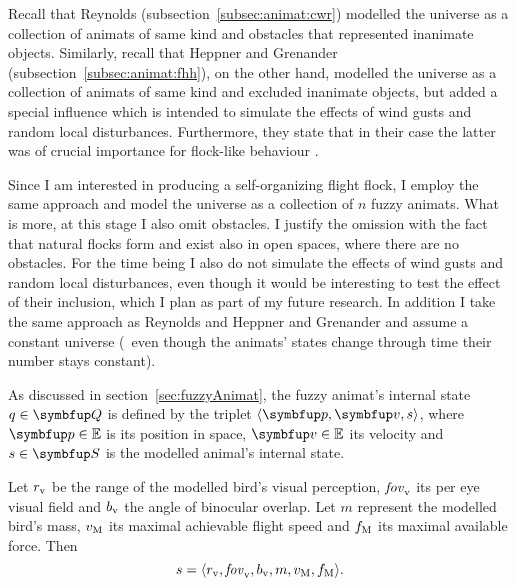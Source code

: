 Recall that Reynolds \cite{reynolds:1987} (subsection~\ref{subsec:animat:cwr}) modelled the universe as a collection of animats of same kind and obstacles that represented inanimate objects. Similarly, recall that Heppner and Grenander \cite{heppner:1990} (subsection~\ref{subsec:animat:fhh}), on the other hand, modelled the universe as a collection of animats of same kind and excluded inanimate objects, but added a special influence which is intended to simulate the effects of wind gusts and random local disturbances. Furthermore, they state that in their case the latter was of crucial importance for flock-like behaviour \cite{heppner:1990}.

Since I am interested in producing a self-organizing flight flock, I employ the same approach and model the universe as a collection of $n$ fuzzy animats. What is more, at this stage I also omit obstacles. I justify the omission with the fact that natural flocks form and exist also in open spaces, where there are no obstacles. For the time being I also do not simulate the effects of wind gusts and random local disturbances, even though it would be interesting to test the effect of their inclusion, which I plan as part of my future research. In addition I take the same approach as Reynolds \cite{reynolds:1987,reynolds:1999} and Heppner and Grenander \cite{heppner:1990} and assume a constant universe (\ie\ even though the animats' states change through time their number stays constant).

As discussed in section~\ref{sec:fuzzyAnimat}, the fuzzy animat's internal state $q \in \set{Q}$ is defined by the triplet $\langle \vect{p}, \vect{v}, s \rangle$, where $\vect{p} \in \E$ is its position in space, $\vect{v} \in \E$ its velocity and $s \in \set{S}$ is the modelled animal's internal state.

\begin{definition}
  \label{def:fuzzyAnimat:s:afd}
  Let $r_\textnormal{v}$ be the range of the modelled bird's visual perception, $\mathit{fov}_\textnormal{v}$ its per eye visual field and $b_\textnormal{v}$ the angle of binocular overlap. Let $m$ represent the modelled bird's mass, $v_\textnormal{M}$ its maximal achievable flight speed and $f_\textnormal{M}$ its maximal available force. Then
  \begin{equation}
    s=\langle r_\textnormal{v}, \mathit{fov}_\textnormal{v}, b_\textnormal{v}, m, v_\textnormal{M}, f_\textnormal{M} \rangle.
  \end{equation}
\end{definition}

